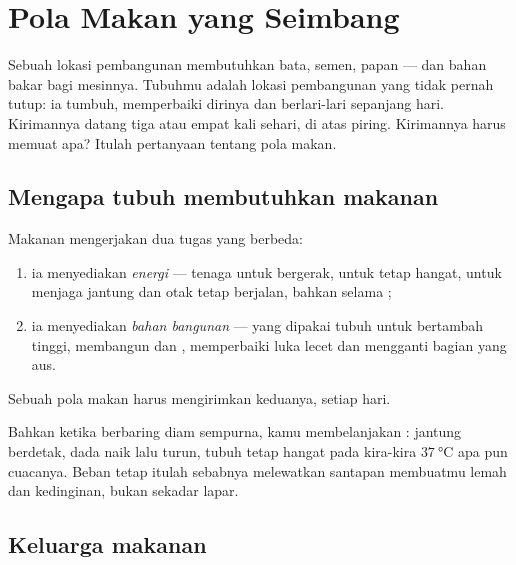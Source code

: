 \chapter{Pola Makan yang Seimbang}\label{ch:g3:balanced-diet}

Sebuah lokasi pembangunan membutuhkan bata, semen, papan --- dan bahan
bakar bagi mesinnya. Tubuhmu adalah lokasi pembangunan yang tidak
pernah tutup: ia tumbuh, memperbaiki dirinya dan berlari-lari
sepanjang hari. Kirimannya datang tiga atau empat kali sehari, di atas
piring. Kirimannya harus memuat apa? Itulah pertanyaan tentang pola
makan.

\section{Mengapa tubuh membutuhkan makanan}

\begin{proposition}\label{prop:g3:balanced-diet:jobs}
Makanan mengerjakan dua tugas yang berbeda:
\begin{enumerate}
  \item ia menyediakan \emph{energi} ---
        tenaga untuk bergerak, untuk tetap hangat, untuk menjaga
        jantung dan otak tetap berjalan, bahkan selama ;
  \item ia menyediakan \emph{bahan bangunan} --- yang dipakai tubuh
        untuk bertambah tinggi, membangun  dan , memperbaiki
        luka lecet dan mengganti bagian yang aus.
\end{enumerate}
Sebuah pola makan harus mengirimkan keduanya, setiap hari.
\end{proposition}
\admitted

\begin{example}\label{ex:g3:balanced-diet:rest}
Bahkan ketika berbaring diam sempurna, kamu membelanjakan :
jantung berdetak, dada naik lalu turun, tubuh tetap hangat pada
kira-kira $\qty{37}{\degreeCelsius}$ apa pun cuacanya. Beban tetap
itulah sebabnya melewatkan santapan membuatmu lemah dan kedinginan,
bukan sekadar lapar.
\end{example}

\section{Keluarga makanan}


